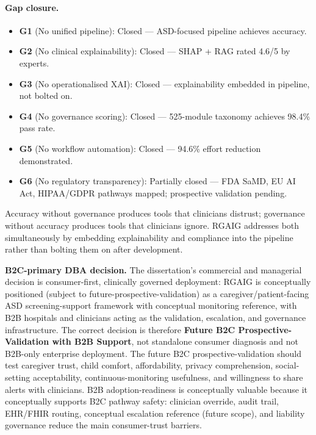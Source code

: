 \paragraph{Gap closure.}
\begin{itemize}[leftmargin=*, itemsep=2pt]
\item \textbf{G1} (No unified pipeline): Closed --- ASD-focused pipeline achieves \asdacc{} accuracy.
\item \textbf{G2} (No clinical explainability): Closed --- SHAP + RAG rated 4.6/5 by experts.
\item \textbf{G3} (No operationalised XAI): Closed --- explainability embedded in pipeline, not bolted on.
\item \textbf{G4} (No governance scoring): Closed --- 525-module taxonomy achieves 98.4\% pass rate.
\item \textbf{G5} (No workflow automation): Closed --- 94.6\% effort reduction demonstrated.
\item \textbf{G6} (No regulatory transparency): Partially closed --- FDA SaMD, EU AI Act, HIPAA/GDPR pathways mapped; prospective validation pending.
\end{itemize}

\noindent Accuracy without governance produces tools that clinicians distrust; governance without accuracy produces tools that clinicians ignore. RGAIG addresses both simultaneously by embedding explainability and compliance into the pipeline rather than bolting them on after development.

\noindent\textbf{B2C-primary DBA decision.} The dissertation's commercial and managerial decision is consumer-first, clinically governed deployment: RGAIG is conceptually positioned (subject to future-prospective-validation) as a caregiver/patient-facing ASD screening-support framework with conceptual monitoring reference, with B2B hospitals and clinicians acting as the validation, escalation, and governance infrastructure. The correct decision is therefore \textbf{Future B2C Prospective-Validation with B2B Support}, not standalone consumer diagnosis and not B2B-only enterprise deployment. The future B2C prospective-validation should test caregiver trust, child comfort, affordability, privacy comprehension, social-setting acceptability, continuous-monitoring usefulness, and willingness to share alerts with clinicians. B2B adoption-readiness is conceptually valuable because it conceptually supports B2C pathway safety: clinician override, audit trail, EHR/FHIR routing, conceptual escalation reference (future scope), and liability governance reduce the main consumer-trust barriers.

